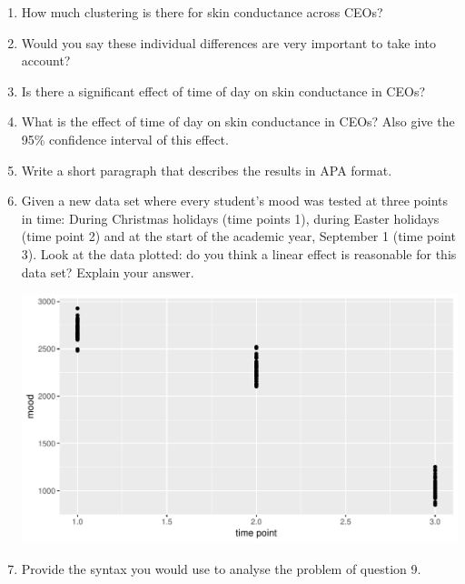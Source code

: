 \documentclass[]{book}\usepackage[]{graphicx}\usepackage[]{color}
\makeatletter
\def\maxwidth{ %
  \ifdim\Gin@nat@width>\linewidth
    \linewidth
  \else
    \Gin@nat@width
  \fi
}
\newenvironment{knitrout}{}{} %
\makeatother
\begin{document}
\begin{enumerate}
\item How much clustering is there for skin conductance across CEOs? \\
\item Would you say these individual differences are very important to take into account? \\
\item Is there a significant effect of time of day on skin conductance in CEOs?\\
\item What is the effect of time of day on skin conductance in CEOs? Also give the 95\% confidence interval of this effect.
\item Write a short paragraph that describes the results in APA format.
\item Given a new data set where every student's mood was tested at three points in time: During Christmas holidays (time points 1), during Easter holidays (time point 2) and at the start of the academic year, September 1 (time point 3). Look at the data plotted: do you think a linear effect is reasonable for this data set? Explain your answer.

\begin{knitrout}
\color{fgcolor}

{\centering \includegraphics[width=\maxwidth]{figure/analysispremidpost8-1} 

}



\end{knitrout}

\item Provide the syntax you would use to analyse the problem of question 9.


\end{enumerate}
\end{document}
